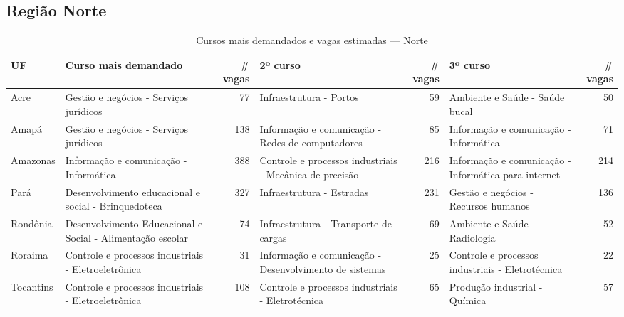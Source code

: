 \subsection{Região Norte}
\begin{table}[ht]
\centering
\caption{Cursos mais demandados e vagas estimadas — Norte}
\label{tab:norte}
\begin{tabular}{l l r l r l r}
\toprule
UF & Curso mais demandado & \# vagas & 2º curso & \# vagas & 3º curso & \# vagas \\
\midrule
Acre & Gestão e negócios - Serviços jurídicos & 77 & Infraestrutura - Portos & 59 & Ambiente e Saúde - Saúde bucal & 50 \\
Amapá & Gestão e negócios - Serviços jurídicos & 138 & Informação e comunicação - Redes de computadores & 85 & Informação e comunicação - Informática & 71 \\
Amazonas & Informação e comunicação - Informática & 388 & Controle e processos industriais - Mecânica de precisão & 216 & Informação e comunicação - Informática para internet & 214 \\
Pará & Desenvolvimento educacional e social - Brinquedoteca & 327 & Infraestrutura - Estradas & 231 & Gestão e negócios - Recursos humanos & 136 \\
Rondônia & Desenvolvimento Educacional e Social - Alimentação escolar & 74 & Infraestrutura - Transporte de cargas & 69 & Ambiente e Saúde - Radiologia & 52 \\
Roraima & Controle e processos industriais - Eletroeletrônica & 31 & Informação e comunicação - Desenvolvimento de sistemas & 25 & Controle e processos industriais - Eletrotécnica & 22 \\
Tocantins & Controle e processos industriais - Eletroeletrônica & 108 & Controle e processos industriais - Eletrotécnica & 65 & Produção industrial - Química & 57 \\
\bottomrule
\end{tabular}
\end{table}

